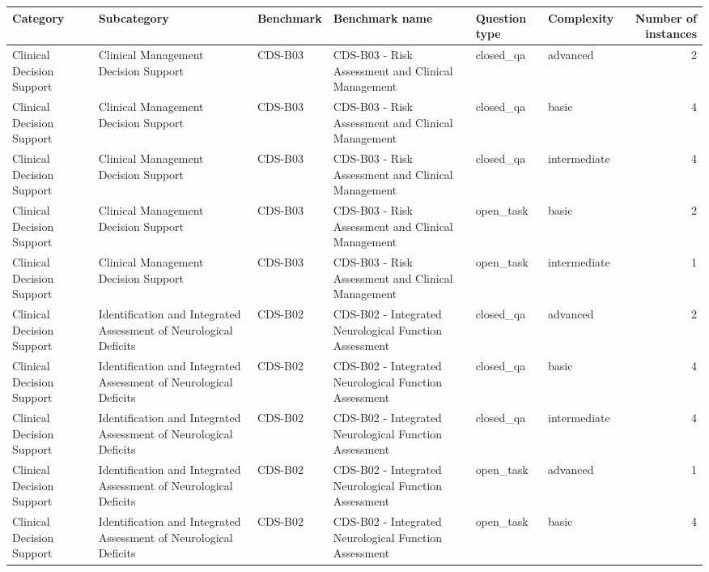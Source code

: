 \begin{tabular}{llllllr}
\toprule
Category & Subcategory & Benchmark & Benchmark name & Question type & Complexity & Number of instances \\
\midrule
Clinical Decision Support & Clinical Management Decision Support & CDS-B03 & CDS-B03 - Risk Assessment and Clinical Management & closed_qa & advanced & 2 \\
Clinical Decision Support & Clinical Management Decision Support & CDS-B03 & CDS-B03 - Risk Assessment and Clinical Management & closed_qa & basic & 4 \\
Clinical Decision Support & Clinical Management Decision Support & CDS-B03 & CDS-B03 - Risk Assessment and Clinical Management & closed_qa & intermediate & 4 \\
Clinical Decision Support & Clinical Management Decision Support & CDS-B03 & CDS-B03 - Risk Assessment and Clinical Management & open_task & basic & 2 \\
Clinical Decision Support & Clinical Management Decision Support & CDS-B03 & CDS-B03 - Risk Assessment and Clinical Management & open_task & intermediate & 1 \\
Clinical Decision Support & Identification and Integrated Assessment of Neurological Deficits & CDS-B02 & CDS-B02 - Integrated Neurological Function Assessment & closed_qa & advanced & 2 \\
Clinical Decision Support & Identification and Integrated Assessment of Neurological Deficits & CDS-B02 & CDS-B02 - Integrated Neurological Function Assessment & closed_qa & basic & 4 \\
Clinical Decision Support & Identification and Integrated Assessment of Neurological Deficits & CDS-B02 & CDS-B02 - Integrated Neurological Function Assessment & closed_qa & intermediate & 4 \\
Clinical Decision Support & Identification and Integrated Assessment of Neurological Deficits & CDS-B02 & CDS-B02 - Integrated Neurological Function Assessment & open_task & advanced & 1 \\
Clinical Decision Support & Identification and Integrated Assessment of Neurological Deficits & CDS-B02 & CDS-B02 - Integrated Neurological Function Assessment & open_task & basic & 4 \\

\end{tabular}
